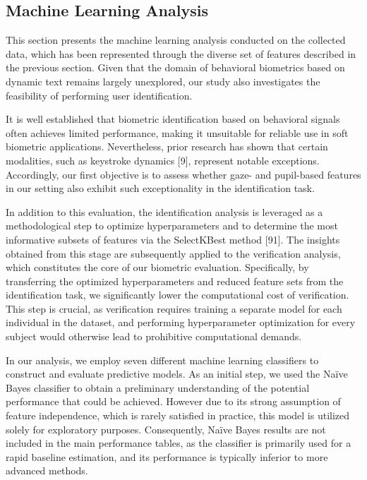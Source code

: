 \documentclass{article}
\begin{document}
\newpage

\subsection{Machine Learning Analysis}

This section presents the machine learning analysis conducted on the collected data, which has been represented through the diverse set of features described in the previous section. 
Given that the domain of behavioral biometrics based on dynamic text remains largely unexplored, our study also investigates the feasibility of performing user identification. 

It is well established that biometric identification based on behavioral signals often achieves limited performance, making it unsuitable for reliable use in soft biometric applications. 
Nevertheless, prior research has shown that certain modalities, such as keystroke dynamics [9], represent notable exceptions. 
Accordingly, our first objective is to assess whether gaze- and pupil-based features in our setting also exhibit such exceptionality in the identification task. 

In addition to this evaluation, the identification analysis is leveraged as a methodological step to optimize hyperparameters and to determine the most informative subsets of features via the SelectKBest method [91]. 
The insights obtained from this stage are subsequently applied to the verification analysis, which constitutes the core of our biometric evaluation. 
Specifically, by transferring the optimized hyperparameters and reduced feature sets from the identification task, we significantly lower the computational cost of verification. 
This step is crucial, as verification requires training a separate model for each individual in the dataset, and performing hyperparameter optimization for every subject would otherwise lead to prohibitive computational demands.

In our analysis, we employ seven different machine learning classifiers to construct and evaluate predictive models.
As an initial step, we used the Naïve Bayes classifier to obtain a preliminary understanding of the potential performance that could be achieved.
However due to its strong assumption of feature independence, which is rarely satisfied in practice, this model is utilized solely for exploratory purposes.
Consequently, Naïve Bayes results are not included in the main performance tables, as the classifier is primarily used for a rapid baseline estimation, and its performance is typically inferior to more advanced methods.
\end{document}
